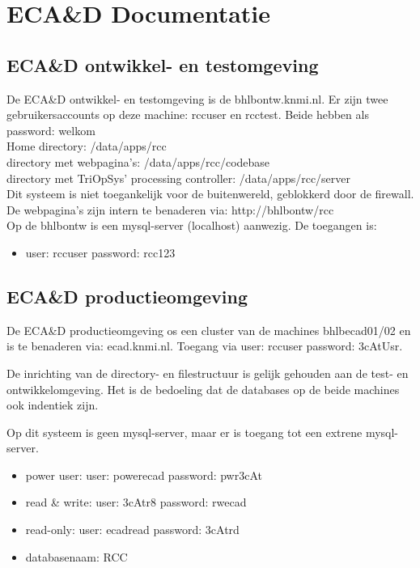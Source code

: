 \documentclass{article}
\begin{document}
\section*{ECA\&D Documentatie}

\subsection*{ECA\&D ontwikkel- en testomgeving}
De ECA\&D ontwikkel- en testomgeving is de bhlbontw.knmi.nl. Er zijn twee gebruikersaccounts op deze machine: 
rccuser en rcctest. Beide hebben als password: welkom\\

\noindent
Home directory: /data/apps/rcc\\
directory met webpagina's: /data/apps/rcc/codebase\\
directory met TriOpSys' processing controller: /data/apps/rcc/server\\

\noindent
Dit systeem is niet toegankelijk voor de buitenwereld, geblokkerd door de firewall. De webpagina's zijn intern
te benaderen via: http://bhlbontw/rcc\\

\noindent
Op de bhlbontw is een mysql-server (localhost) aanwezig.
De toegangen is:
\begin{itemize}
\item user: rccuser password: rcc123
\end{itemize}

\subsection*{ECA\&D productieomgeving}
De ECA\&D productieomgeving os een cluster van de machines bhlbecad01/02 en is te benaderen via: ecad.knmi.nl.
Toegang via user: rccuser password: 3cAtUsr.

\noindent
De inrichting van de directory- en filestructuur is gelijk gehouden aan de test- en ontwikkelomgeving. Het is de 
bedoeling dat de databases op de beide machines ook indentiek zijn.

Op dit systeem is geen mysql-server, maar er is toegang tot een extrene mysql-server. 
\begin{itemize}
\item power user: user: powerecad password: pwr3cAt
\item read \& write: user: 3cAtr8 password: rwecad
\item read-only: user: ecadread password: 3cAtrd
\item databasenaam: RCC
\end{itemize}
\end{document}
